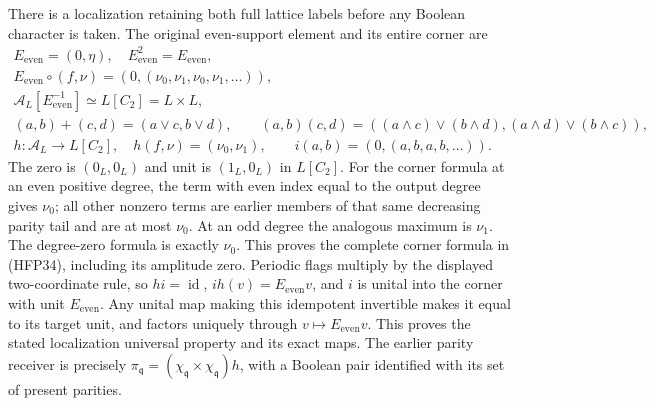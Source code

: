 There is a localization retaining both full lattice labels before
any Boolean character is taken. The original even-support element
and its entire corner are
\begin{equation}\tag{HFP34}
\begin{gathered}
 E_{\mathrm{even}}=(0,\eta),\quad E_{\mathrm{even}}^2=E_{\mathrm{even}},\\
 E_{\mathrm{even}}\circ(f,\nu)
       =(0,(\nu_0,\nu_1,\nu_0,\nu_1,\ldots)),\\
 \mathcal A_L[E_{\mathrm{even}}^{-1}]
       \simeq L[C_2]=L\times L,\\
 (a,b)+(c,d)=(a\vee c,b\vee d),\qquad
 (a,b)(c,d)=((a\wedge c)\vee(b\wedge d),
                     (a\wedge d)\vee(b\wedge c)),\\
 h:\mathcal A_L\longrightarrow L[C_2],\quad h(f,\nu)=(\nu_0,\nu_1),
 \qquad i(a,b)=(0,(a,b,a,b,\ldots)).
\end{gathered}
\end{equation}
The zero is $(0_L,0_L)$ and unit is $(1_L,0_L)$ in $L[C_2]$.
For the corner formula at an even positive degree, the term
with even index equal to the output degree gives $\nu_0$;
all other nonzero terms are earlier members of that same
decreasing parity tail and are at most $\nu_0$. At an odd
degree the analogous maximum is $\nu_1$. The degree-zero
formula is exactly $\nu_0$. This proves the complete corner
formula in (HFP34), including its amplitude zero.
Periodic flags multiply by the displayed two-coordinate rule,
so $hi=\operatorname{id}$, $ih(v)=E_{\mathrm{even}}v$, and
$i$ is unital into the corner with unit $E_{\mathrm{even}}$.
Any unital map making this idempotent invertible makes it
equal to its target unit, and factors uniquely through
$v\mapsto E_{\mathrm{even}}v$. This proves the stated
localization universal property and its exact maps. The
earlier parity receiver is precisely
$\pi_{\mathfrak q}=(\chi_{\mathfrak q}\times\chi_{\mathfrak q})h$,
with a Boolean pair identified with its set of present parities.

